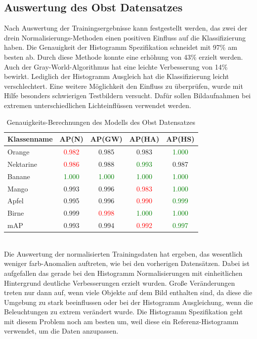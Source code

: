 \documentclass[a4paper,12pt,oneside]{article}
\begin{document}
\subsection{Auswertung des Obst Datensatzes}
Nach Auswertung der Trainingsergebnisse kann festgestellt werden, das zwei der drein Normalisierungs-Methoden einen positiven Einfluss auf die Klassifizierung haben. Die Genauigkeit der Histogramm Spezifikation schneidet mit 97\% am besten ab. Durch diese Methode konnte eine erhöhung von 43\% erzielt werden. Auch der Gray-World-Algorithmus hat eine leichte Verbesserung von 14\% bewirkt. Lediglich der Histogramm Ausgleich hat die Klassifizierung leicht verschlechtert. Eine weitere Möglichkeit den Einfluss zu überprüfen, wurde mit Hilfe besonders schwierigen Testbildern versucht. Dafür sollen Bildaufnahmen bei extremen unterschiedlichen Lichteinflüssen verwendet werden.
\begin{table}
[h]
\caption{Genauigkeits-Berechnungen des Modells des Obst Datensatzes}
\centering
\begin{tabular}{|l|c|c|c|c|}
\hline
Klassenname & AP(N) & AP(GW) & AP(HA) & AP(HS)\\
\hline
Orange & \textcolor{red}{0.982} & 0.985 & 0.983 & \textcolor{green}{1.000}\\
Nektarine & \textcolor{red}{0.986} & 0.988 & \textcolor{green}{0.993} & 0.987\\
Banane & \textcolor{green}{1.000} & \textcolor{green}{1.000} & \textcolor{green}{1.000} & \textcolor{green}{1.000}\\
Mango & 0.993 & 0.996 & \textcolor{red}{0.983} & \textcolor{green}{1.000}\\
Apfel & 0.995 & 0.996 & \textcolor{red}{0.990} & \textcolor{green}{0.999}\\
Birne & 0.999 & \textcolor{red}{0.998} & \textcolor{green}{1.000} & \textcolor{green}{1.000}\\
\hline
mAP & 0.993 & 0.994 & \textcolor{red}{0.992} & \textcolor{green}{0.997}\\
\hline
\end{tabular}
\end{table}\\
Die Auswertung der normalisierten Trainingsdaten hat ergeben, das wesentlich weniger farb-Anomalien auftreten, wie bei den vorherigen Datensätzen. Dabei ist aufgefallen das gerade bei den Histogramm Normalisierungen mit einheitlichen Hintergrund deutliche Verbesserungen erzielt wurden. Große Veränderungen treten nur dann auf, wenn viele Objekte auf dem Bild enthalten sind, da diese die Umgebung zu stark beeinflussen oder bei der Histogramm Ausgleichung, wenn die Beleuchtungen zu extrem verändert wurde. Die Histogramm Spezifikation geht mit diesem Problem noch am besten um, weil diese ein Referenz-Histogramm verwendet, um die Daten anzupassen. \\\\
\end{document}
